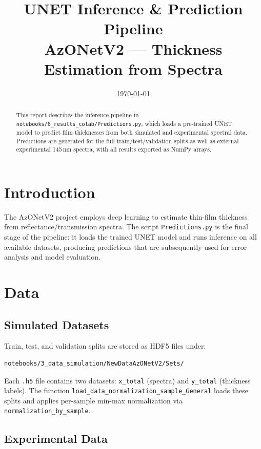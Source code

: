 \documentclass[11pt,a4paper]{article}
\title{UNET Inference \& Prediction Pipeline \\ {\normalsize AzONetV2 — Thickness Estimation from Spectra}}
\author{}
\date{\today}
\begin{document}
\maketitle

\begin{abstract}
This report describes the inference pipeline in \texttt{notebooks/6\_results\_colab/Predictions.py}, which loads a pre-trained UNET model to predict film thicknesses from both simulated and experimental spectral data. Predictions are generated for the full train/test/validation splits as well as external experimental 145\,nm spectra, with all results exported as NumPy arrays.
\end{abstract}

\section{Introduction}

The AzONetV2 project employs deep learning to estimate thin-film thickness from reflectance/transmission spectra. The script \texttt{Predictions.py} is the final stage of the pipeline: it loads the trained UNET model and runs inference on all available datasets, producing predictions that are subsequently used for error analysis and model evaluation.

\section{Data}

\subsection{Simulated Datasets}

Train, test, and validation splits are stored as HDF5 files under:

\begin{verbatim}
notebooks/3_data_simulation/NewDataAzONetV2/Sets/
\end{verbatim}

Each \texttt{.h5} file contains two datasets: \texttt{x\_total} (spectra) and \texttt{y\_total} (thickness labels). The function \texttt{load\_data\_normalization\_sample\_General} loads these splits and applies per-sample min-max normalization via \texttt{normalization\_by\_sample}.

\subsection{Experimental Data}
\end{document}
